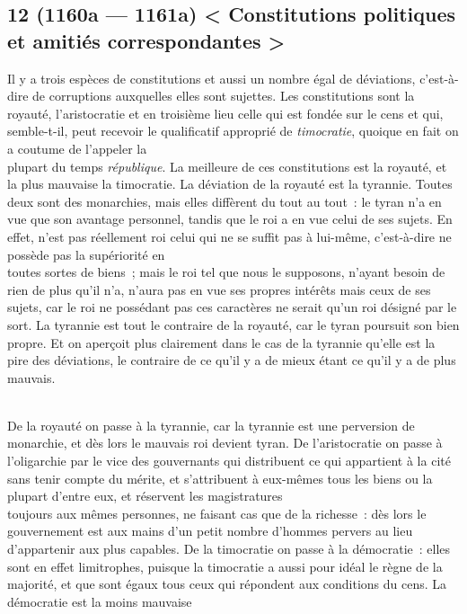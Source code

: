 \documentclass[french,twoside]{book} %
\begin{document}
\subsection[{12 (1160a — 1161a) < Constitutions politiques et amitiés correspondantes >}]{12 (1160a — 1161a) < Constitutions politiques et amitiés correspondantes >}
\noindent Il y a trois espèces de constitutions et aussi un nombre égal de déviations, c’est-à-dire de corruptions auxquelles elles sont sujettes. Les constitutions sont la royauté, l’aristocratie et en troisième lieu celle qui est fondée sur le cens et qui, semble-t-il, peut recevoir le qualificatif approprié de {\itshape timocratie}, quoique en fait on a coutume de l’appeler la \\
plupart du temps {\itshape république}. La meilleure de ces constitutions est la royauté, et la plus mauvaise la timocratie. La déviation  de la royauté est la tyrannie. Toutes deux sont des monarchies, mais elles diffèrent du tout au tout : le tyran n’a en vue que son avantage personnel, tandis que le roi a en vue celui de ses sujets. En effet, n’est pas réellement roi celui qui ne se suffit pas à lui-même, c’est-à-dire ne possède pas la supériorité en \\
toutes sortes de biens ; mais le roi tel que nous le supposons, n’ayant besoin de rien de plus qu’il n’a, n’aura pas en vue ses propres intérêts mais ceux de ses sujets, car le roi ne possédant pas ces caractères ne serait qu’un roi désigné par le sort. La tyrannie est tout le contraire de la royauté, car le tyran poursuit son bien propre. Et on aperçoit plus clairement dans le cas de la tyrannie qu’elle est la pire des déviations, le contraire de ce qu’il y a de mieux étant ce qu’il y a de plus mauvais.\par
\\
De la royauté on passe à la tyrannie, car la tyrannie est une perversion de monarchie, et dès lors le mauvais roi devient tyran. De l’aristocratie on passe à l’oligarchie par le vice des gouvernants qui distribuent ce qui appartient à la cité sans tenir compte du mérite, et s’attribuent à eux-mêmes tous les biens ou la plupart d’entre eux, et réservent les magistratures \\
toujours aux mêmes personnes, ne faisant cas que de la richesse : dès lors le gouvernement est aux mains d’un petit nombre d’hommes pervers au lieu d’appartenir aux plus capables. De la timocratie on passe à la démocratie : elles sont en effet limitrophes, puisque la timocratie a aussi pour idéal le règne de la majorité, et que sont égaux tous ceux qui répondent aux conditions du cens. La démocratie est la moins mauvaise \\
\end{document}
